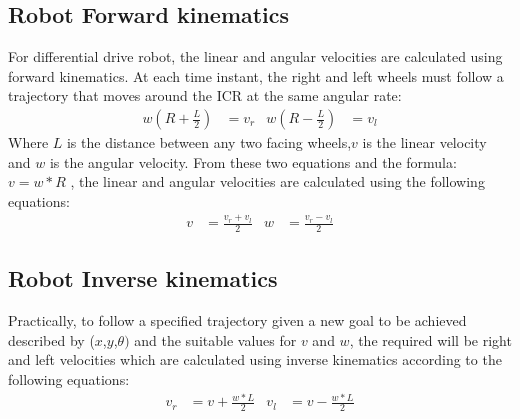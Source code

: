\subsection{Robot Forward kinematics}
\hspace{2cm}For differential drive robot, the linear and angular velocities are calculated using forward kinematics.
At each time instant, the right and left wheels must follow a trajectory that moves around the ICR at the same angular rate:
\begin{align*}
w(R + \frac{L}{2}) & = v_r  &  w(R - \frac{L}{2}) & = v_l
\end{align*}
 Where $L$  is the distance between any two facing wheels,$v$ is the linear velocity and $w$ is the angular velocity.
From these two equations and the formula: $v = w * R$ , the linear and angular velocities are calculated using the following equations:
\begin{align*}
v & = \frac{v_r + v_l}{2} & w & = \frac{v_r - v_l}{2}
\end{align*}
\subsection{Robot Inverse kinematics}
\hspace{2cm}Practically, to follow a specified trajectory given a new goal to be achieved described by ($x$,$y$,\(\theta)\) and the suitable values for $v$ and $w$, the required will be right and left velocities which are calculated using inverse kinematics according to the following equations:
\begin{align*}
v_r & = v + \frac{w * L}{2} & v_l & = v - \frac{w*L}{2}
\end{align*}
%

